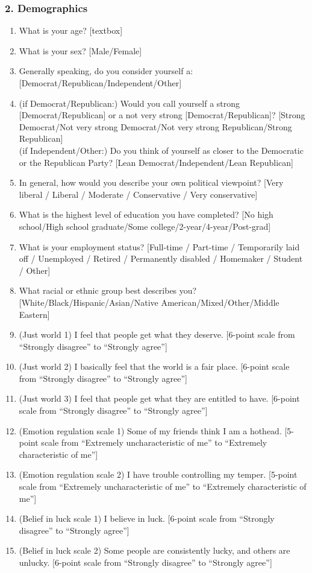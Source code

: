\subsubsection*{2. Demographics}
\begin{enumerate}
    \item What is your age? [textbox]
    \item What is your sex? [Male/Female]
    \item Generally speaking, do you consider yourself a: [Democrat/Republican/Independent/Other]
    \item (if Democrat/Republican:) Would you call yourself a strong [Democrat/Republican] or
    a not very strong [Democrat/Republican]? [Strong Democrat/Not very strong
    Democrat/Not very strong Republican/Strong Republican]
    \\
    (if Independent/Other:) Do you think of yourself as closer to the
    Democratic or the Republican Party? [Lean Democrat/Independent/Lean
    Republican]
    \item In general, how would you describe your own political viewpoint?
    [Very liberal / Liberal / Moderate / Conservative / Very conservative]
    \item What is the highest level of education you have completed? [No high
    school/High school graduate/Some college/2-year/4-year/Post-grad] 
    \item What
    is your employment status? [Full-time / Part-time / Temporarily laid off /
    Unemployed / Retired / Permanently disabled / Homemaker / Student / Other]
    \item What racial or ethnic group best describes you?
    [White/Black/Hispanic/Asian/Native American/Mixed/Other/Middle Eastern]
    \item (Just world 1) I feel that people get what they deserve. [6-point
    scale from ``Strongly disagree'' to ``Strongly agree''] 
    \item (Just world 2) I
    basically feel that the world is a fair place. [6-point scale from ``Strongly
    disagree'' to ``Strongly agree''] 
    \item (Just world 3) I feel that people get what
    they are entitled to have. [6-point scale from ``Strongly disagree'' to ``Strongly
    agree''] 
    \item (Emotion regulation scale 1) Some of my friends think I am a
    hothead. [5-point scale from ``Extremely uncharacteristic of me'' to
    ``Extremely characteristic of me''] 
    \item (Emotion regulation scale 2) I have
    trouble controlling my temper. [5-point scale from ``Extremely
    uncharacteristic of me'' to ``Extremely characteristic of me''] 
    \item (Belief
    in luck scale 1) I believe in luck. [6-point scale from ``Strongly disagree'' to
    ``Strongly agree''] 
    \item (Belief in luck scale 2) Some people are consistently
    lucky, and others are unlucky. [6-point scale from ``Strongly disagree'' to
    ``Strongly agree'']
\end{enumerate}

